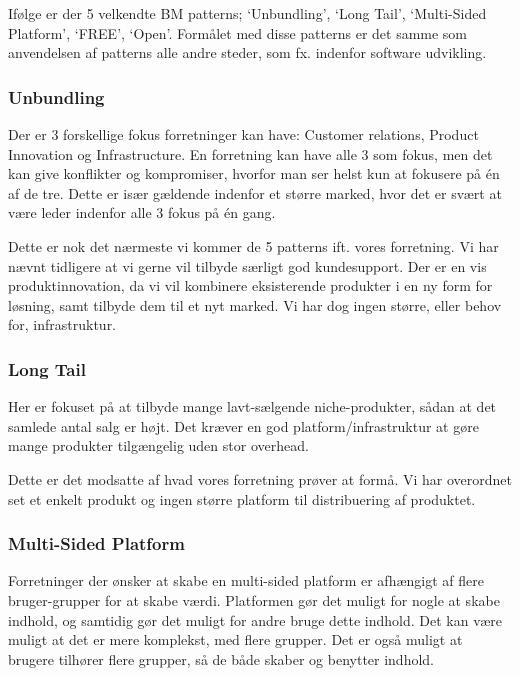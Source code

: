 

Ifølge \citet[pp. 52-119]{osterwalder2009business} er der 5 velkendte BM patterns; `Unbundling', `Long Tail', `Multi-Sided Platform', `FREE', `Open'.
Formålet med disse patterns er det samme som anvendelsen af patterns alle andre steder, som fx. indenfor software udvikling.

\subsubsection{Unbundling}
Der er 3 forskellige fokus forretninger kan have: Customer relations, Product Innovation og Infrastructure.
En forretning kan have alle 3 som fokus, men det kan give konflikter og kompromiser, hvorfor man ser helst kun at fokusere på én af de tre.
Dette er især gældende indenfor et større marked, hvor det er svært at være leder indenfor alle 3 fokus på én gang.

Dette er nok det nærmeste vi kommer de 5 patterns ift. vores forretning.
Vi har nævnt tidligere at vi gerne vil tilbyde særligt god kundesupport.
Der er en vis produktinnovation, da vi vil kombinere eksisterende produkter i en ny form for løsning, samt tilbyde dem til et nyt marked.
Vi har dog ingen større, eller behov for, infrastruktur.

\subsubsection{Long Tail}
Her er fokuset på at tilbyde mange lavt-sælgende niche-produkter, sådan at det samlede antal salg er højt.
Det kræver en god platform/infrastruktur at gøre mange produkter tilgængelig uden stor overhead.

Dette er det modsatte af hvad vores forretning prøver at formå.
Vi har overordnet set et enkelt produkt og ingen større platform til distribuering af produktet.

\subsubsection{Multi-Sided Platform}
Forretninger der ønsker at skabe en multi-sided platform er afhængigt af flere bruger-grupper for at skabe værdi.
Platformen gør det muligt for nogle at skabe indhold, og samtidig gør det muligt for andre bruge dette indhold.
Det kan være muligt at det er mere komplekst, med flere grupper.
Det er også muligt at brugere tilhører flere grupper, så de både skaber og benytter indhold.

